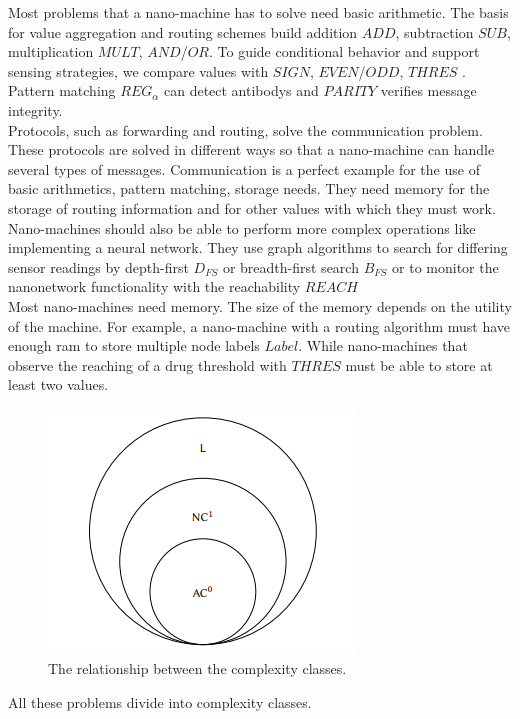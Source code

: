 \documentclass[10pt,sigconf]{acmart}
\begin{document}
Most problems that a nano-machine has to solve need basic arithmetic.
The basis for value aggregation and routing schemes build addition $ADD$, subtraction $SUB$, multiplication $MULT$, $AND$/$OR$.
To guide conditional behavior and support sensing strategies, we compare values with $SIGN$, $EVEN$/$ODD$, $THRES$ .\\
Pattern matching $REG_{\alpha}$ can detect antibodys and $PARITY$ verifies message integrity.\\
Protocols, such as forwarding and routing, solve the communication problem. 
These protocols are solved in different ways so that a nano-machine can handle several types of messages.
Communication is a perfect example for the use of basic arithmetics, pattern matching, storage needs.
They need memory for the storage of routing information and for other values with which they must work.\\
Nano-machines should also be able to perform more complex operations like implementing a neural network.
They use graph algorithms to search for differing sensor readings by depth-first $D_{FS}$ or breadth-first search $B_{FS}$ or to monitor the nanonetwork functionality with the reachability $REACH$\\
Most nano-machines need memory. The size of the memory depends on the utility of the machine.
For example, a nano-machine with a routing algorithm must have enough ram to store multiple node labels $Label$.
While nano-machines that observe the reaching of a drug threshold with $THRES$ must be able to store at least two values.\\
\begin{figure}[h!]
  \centering
  \includegraphics[scale=1]{ComplexityClasses.PNG}
\caption[]{The relationship between the complexity classes.\cite{lau2017computational}}
\label{complex}
\end{figure}
All these problems divide into complexity classes.
\end{document}

